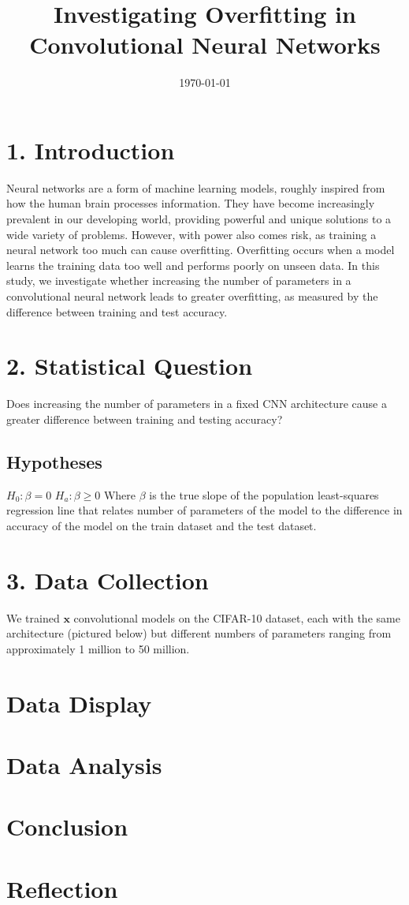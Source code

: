 \documentclass[12pt]{article}
\title{Investigating Overfitting in Convolutional Neural Networks}
\date{\today}
\begin{document}
    \maketitle

    \section*{1. Introduction}

    Neural networks are a form of machine learning models, roughly inspired from how the human brain processes information.
    They have become increasingly prevalent in our developing world, providing powerful and unique solutions to a wide variety of problems.
    However, with power also comes risk, as training a neural network too much can cause overfitting.
    Overfitting occurs when a model learns the training data too well and performs poorly on unseen data.
    In this study, we investigate whether increasing the number of parameters in a convolutional neural network
    leads to greater overfitting, as measured by the difference between training and test accuracy.

    \section*{2. Statistical Question}

    Does increasing the number of parameters in a fixed CNN architecture cause a greater difference between training and testing accuracy?

    \subsection*{Hypotheses}

    $H_0: \beta = 0$ \newline
    $H_a: \beta \geq 0$
    \newline \newline
    Where $\beta$ is the true slope of the population least-squares regression line that relates number of parameters of the model to the difference in accuracy of the model on the train dataset and the test dataset.

    \section*{3. Data Collection}

    We trained $\mathbf{x}$ convolutional models on the CIFAR-10 dataset, each with the same architecture (pictured below) but different numbers of
    parameters ranging from approximately 1 million to 50 million.


    \section*{Data Display}


    \section*{Data Analysis}

    \section*{Conclusion}

    \section*{Reflection}
\end{document}
